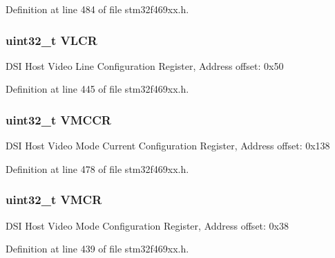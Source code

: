 Definition at line 484 of file stm32f469xx.\+h.

\subsubsection[{\texorpdfstring{V\+L\+CR}{VLCR}}]{ uint32\+\_\+t V\+L\+CR}\hypertarget{struct_d_s_i___type_def_a2705ad75dd72e009b8df3400b8819426}{}\label{struct_d_s_i___type_def_a2705ad75dd72e009b8df3400b8819426}
D\+SI Host Video Line Configuration Register, Address offset\+: 0x50 

Definition at line 445 of file stm32f469xx.\+h.

\subsubsection[{\texorpdfstring{V\+M\+C\+CR}{VMCCR}}]{ uint32\+\_\+t V\+M\+C\+CR}\hypertarget{struct_d_s_i___type_def_ad17bfd107d8f1cc3648f028ee2d1f8a7}{}\label{struct_d_s_i___type_def_ad17bfd107d8f1cc3648f028ee2d1f8a7}
D\+SI Host Video Mode Current Configuration Register, Address offset\+: 0x138 

Definition at line 478 of file stm32f469xx.\+h.

\subsubsection[{\texorpdfstring{V\+M\+CR}{VMCR}}]{ uint32\+\_\+t V\+M\+CR}\hypertarget{struct_d_s_i___type_def_a1f5e9f6d7b4cd70ea6bbe007a0c80cc2}{}\label{struct_d_s_i___type_def_a1f5e9f6d7b4cd70ea6bbe007a0c80cc2}
D\+SI Host Video Mode Configuration Register, Address offset\+: 0x38 

Definition at line 439 of file stm32f469xx.\+h.

